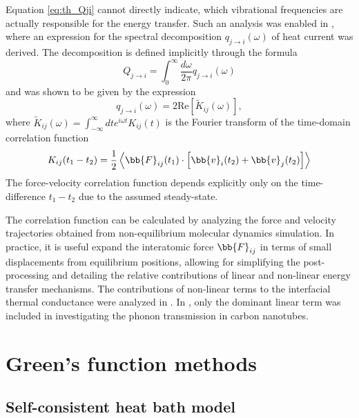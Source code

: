 Equation \eqref{eq:th_Qji} cannot directly indicate, which vibrational frequencies are actually responsible for the energy transfer. Such an analysis was enabled in , where an expression for the spectral decomposition $q_{j\to i}(\omega)$ of heat current was derived. The decomposition is defined implicitly through the formula
\begin{equation}
 Q_{j\to i} = \int_0^{\infty} \frac{d\omega}{2\pi} q_{j\to i}(\omega)
\end{equation}
and was shown to be given by the expression
\begin{equation}
 q_{j \to i}(\omega) = 2\textrm{Re} [\tilde K_{ij}(\omega)],
\end{equation}
where $\tilde K_{ij}(\omega)=\int_{-\infty}^{\infty} dt e^{i\omega t}K_{ij}(t)$ is the Fourier transform of the time-domain correlation function
\begin{equation}
 K_{ij}(t_1-t_2) = \frac{1}{2} \left\langle \bb{F}_{ij}(t_1) \cdot \left[ \bb{v}_i(t_2)+\bb{v}_j(t_2)\right] \right\rangle \label{eq:th_Kijt1t2}
\end{equation}
The force-velocity correlation function depends explicitly only on the time-difference $t_1-t_2$ due to the assumed steady-state. 

The correlation function can be calculated by analyzing the force and velocity trajectories obtained from non-equilibrium molecular dynamics simulation. In practice, it is useful expand the interatomic force $\bb{F}_{ij}$ in terms of small displacements from equilibrium positions, allowing for simplifying the post-processing and detailing the relative contributions of linear and non-linear energy transfer mechanisms. The contributions of non-linear terms to the interfacial thermal conductance were analyzed in . In , only the dominant linear term was included in investigating the phonon transmission in carbon nanotubes.





\section{Green's function methods}


\subsection{Self-consistent heat bath model}
\label{sec:th_selfconsistentbaths}

